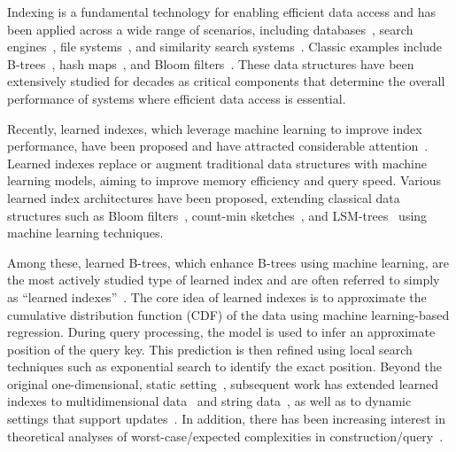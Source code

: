 \documentclass[acmsmall]{acmart}
\begin{document}
Indexing is a fundamental technology for enabling efficient data access and has been applied across a wide range of scenarios, including databases~\cite{ramakrishnan2002database}, search engines~\cite{schutze2008introduction}, file systems~\cite{ghemawat2003google}, and similarity search systems~\cite{aumuller2023recent,aumuller2020ann}.
Classic examples include B-trees~\cite{bayer1972organization}, hash maps~\cite{knuth1998sorting}, and Bloom filters~\cite{bloom1970spacetime}.
These data structures have been extensively studied for decades as critical components that determine the overall performance of systems where efficient data access is essential.

Recently, learned indexes, which leverage machine learning to improve index performance, have been proposed and have attracted considerable attention~\cite{kraska2018case_li}.
Learned indexes replace or augment traditional data structures with machine learning models, aiming to improve memory efficiency and query speed.
Various learned index architectures have been proposed, extending classical data structures such as Bloom filters~\cite{mitzenmacher2018model,dai2020adaptive,vaidya2020partitioned,sato2023fast}, count-min sketches~\cite{hsu2019learning,zhang2020learned,dolera2023learning,nishishita2025optimized}, and LSM-trees~\cite{yang2020leaper,lu2022tridentkv,dai2020wisckey,mo2023learning} using machine learning techniques.

Among these, learned B-trees, which enhance B-trees using machine learning, are the most actively studied type of learned index and are often referred to simply as ``learned indexes''~\cite{galakatos2019fiting,ding2020alex,ferragina2020pgm,wang2020sindex,sun2023learned,amarasinghe2025learned,wu2022nfl}.
The core idea of learned indexes is to approximate the cumulative distribution function (CDF) of the data using machine learning-based regression.
During query processing, the model is used to infer an approximate position of the query key.
This prediction is then refined using local search techniques such as exponential search to identify the exact position.
Beyond the original one-dimensional, static setting~\cite{kraska2018case_li,kipf2020radixspline,marcus2020cdfshop,wu2022nfl,amarasinghe2025learned},
subsequent work has extended learned indexes to multidimensional data~\cite{li2020lisa,nathan2020learning,ding2020tsunami,qi2020effectively,wang2019learned,hidaka2024flexflood,al2024survey}
and string data~\cite{wang2020sindex,yang2024lits,zhou2024slipp,spector2021bounding,kim2024accelerating},
as well as to dynamic settings that support updates~\cite{ding2020alex,li2019scalable,lu2021apex,tang2020xindex,li2021finedex,galakatos2019fiting,ferragina2020pgm,wu2021updatable,wang2025new}.
In addition, there has been increasing interest in theoretical analyses of worst-case/expected complexities in construction/query~\cite{ferragina2020why,zeighami2023distribution,croquevielle2025beyond,zeighami2024theoretical,liu2024learned}.
\end{document}
